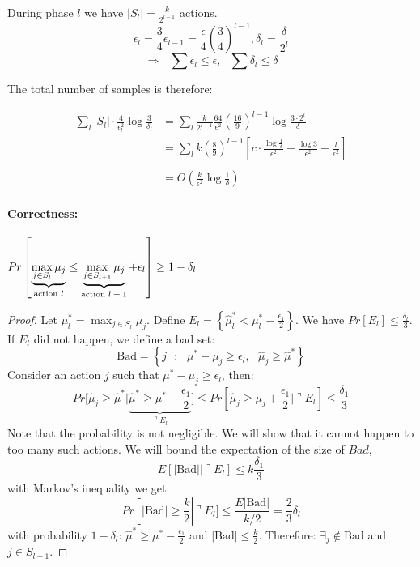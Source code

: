 During phase $l$ we have $\left|S_{l}\right|=\frac{k}{2^{l-1}}$
actions.
\[
\epsilon_{l}=\frac{3}{4}\epsilon_{l-1}=\frac{\epsilon}{4}\left(\frac{3}{4}\right)^{l-1},\text{
}\delta_{l}=\frac{\delta}{2^{l}}
\]
\[
\Rightarrow\text{ }{\displaystyle \sum\epsilon_{l}\le\epsilon},\text{ }{\displaystyle \sum\delta_{l}\le\delta}
\]

The total number of samples is therefore:

\begin{align*}
 \sum_l |S_l| \cdot \frac{4}{\epsilon_l^2}\log \frac{3}{\delta_l} &=
\sum_{l}\frac{k}{2^{l-1}}\frac{64}{\epsilon^{2}}\left(\frac{16}{9}\right)^{l-1}\log\frac{3\cdot2^{l}}{\delta}\\
& =  {\displaystyle \sum_{l}k\left(\frac{8}{9}\right)^{l-1}\left[c\cdot\frac{\log\frac{1}{\delta}}{\epsilon^{2}}+\frac{\log3}{\epsilon^{2}}+\frac{l}{\epsilon^{2}}\right]}\\
\\
 & =  O\left(\frac{k}{\epsilon^{2}}\log\frac{1}{\delta}\right)
\end{align*}


\paragraph{Correctness:}

\begin{theorem}
$Pr\left[\underbrace{{\displaystyle \max_{j\in
S_{l}}\mu_{j}}}_{\text{action
\ensuremath{l}}}\le\underbrace{{\displaystyle \max_{j\in
S_{l+1}}\mu_{j}}}_{\text{action
\ensuremath{l+1}}}+\epsilon_{l}\right]\ge1-\delta_{l}$
\end{theorem}

\begin{proof}
Let $\mu^*_l=\max_{j\in S_l} \mu_j$.
Define $E_{l}=\left\{\hat{\mu}^{*}_l<\mu^{*}_l-\frac{\epsilon_{1}}{2}\right\}$.
We have  $Pr\left[E_{l}\right]\le\frac{\delta_{l}}{3}$. If $E_{l}$ did not happen, we define a bad set:
\[
\text{Bad}=\left\{ j\text{ }:\text{ }\mu^{*}-\mu_{j}\ge\epsilon_{l},\text{ }\hat{\mu}_{j}\ge\hat{\mu}^{*}\right\}
\]
Consider an action $j$ such that $\mu^*-\mu_j\geq \epsilon_l$, then:
\[
Pr[\hat{\mu}_{j}\geq
\hat{\mu}^{*}|\underbrace{\hat{\mu}^{*}\ge\mu^{*}-\frac{\epsilon_{1}}{2}}_{\urcorner
E_{l}}\big] \le
Pr[\hat{\mu}_{j}\ge\mu_{j}+\frac{\epsilon_{1}}{2}|\urcorner E_{l}]
\le  \frac{\delta_{1}}{3}
\]
Note that the probability is not negligible. We will show that it cannot happen to too many such actions. We will bound the expectation of the size of $Bad$,
\[
E[|\text{Bad}||\urcorner E_{l}]\le k\frac{\delta_{1}}{3}
\]
 with Markov's inequality we get:
\[
Pr\left[\left|\text{Bad}\right|\ge\frac{k}{2}\right|\urcorner E_{l}]
 \le  \frac{E\left|\text{Bad}\right|}{k/2}
  =  \frac{2}{3}\delta_{l}
\]
 with probability $1-\delta_{l}$: $\hat{\mu}^{*}\ge\mu^{*}-\frac{\epsilon_{1}}{2}$ and $\left|\text{Bad}\right|\le\frac{k}{2}$. Therefore: $\exists_{j}\notin\text{Bad}$ and $j\in S_{l+1}$.
\end{proof}
